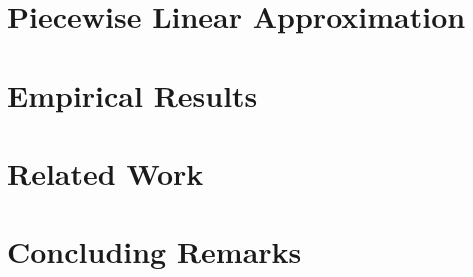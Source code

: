 \documentclass{article}
\begin{document}


\section{Piecewise Linear Approximation}



\section{Empirical Results}



\section{Related Work}



\section{Concluding Remarks}







\end{document}
